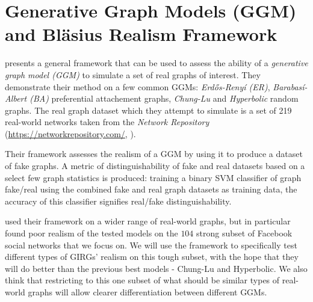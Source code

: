 \chapter{Generative Graph Models (GGM) and Bl{\"a}sius Realism Framework}
\label{chap:GGM}
\minitoc


\cite{blasius2018towards} presents a general framework that can be used to assess the ability of a \textit{generative graph model (GGM)} to simulate a set of real graphs of interest. They demonstrate their method on a few common GGMs: \textit{Erd\H{o}s-Reny{\'i} (ER)}, \textit{Barabas{\'i}-Albert (BA)} preferential attachement graphs, \textit{Chung-Lu} and \textit{Hyperbolic} random graphs. The real graph dataset which they attempt to simulate is a set of 219 real-world networks taken from the \textit{Network Repository} (\url{https://networkrepository.com/}, \cite{rossi2015network}).

Their framework assesses the realism of a GGM by using it to produce a dataset of fake graphs. A metric of distinguishability of fake and real datasets based on a select few graph statistics is produced: training a binary SVM classifier of graph \textrightarrow fake/real using the combined fake and real graph datasets as training data, the accuracy of this classifier signifies real/fake distinguishability.

\cite{blasius2018towards} used their framework on a wider range of real-world graphs, but in particular found poor realism of the tested models on the $104$ strong subset of Facebook social networks that we focus on. We will use the framework to specifically test different types of GIRGs' realism on this tough subset, with the hope that they will do better than the previous best models - Chung-Lu and Hyperbolic. We also think that restricting to this one subset of what should be similar types of real-world graphs will allow clearer differentiation between different GGMs.



